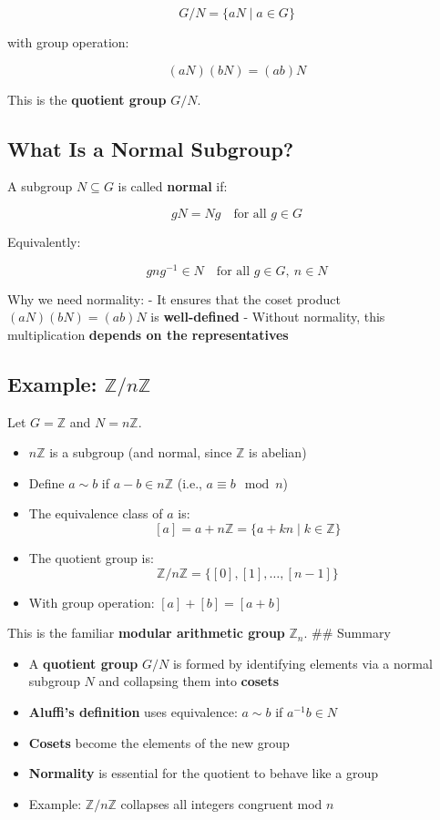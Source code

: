 \documentclass[]{article}
\providecommand{\tightlist}{%
  \setlength{\itemsep}{0pt}\setlength{\parskip}{0pt}}
\begin{document}
\[
G / N = \{ aN \mid a \in G \}
\]

with group operation:

\[
(aN)(bN) = (ab)N
\]

This is the \textbf{quotient group} \(G/N\).

\subsection{ What Is a Normal
Subgroup?}\label{what-is-a-normal-subgroup}

A subgroup \(N \subseteq G\) is called \textbf{normal} if:

\[
gN = Ng \quad \text{for all } g \in G
\]

Equivalently:

\[
gng^{-1} \in N \quad \text{for all } g \in G,\ n \in N
\]

Why we need normality: - It ensures that the coset product
\((aN)(bN) = (ab)N\) is \textbf{well-defined} - Without normality, this
multiplication \textbf{depends on the representatives}

\subsection{\texorpdfstring{Example:
\(\mathbb{Z} / n\mathbb{Z}\)}{Example: \textbackslash mathbb\{Z\} / n\textbackslash mathbb\{Z\}}}\label{example-mathbbz-nmathbbz}

Let \(G = \mathbb{Z}\) and \(N = n\mathbb{Z}\).

\begin{itemize}
\tightlist
\item
  \(n\mathbb{Z}\) is a subgroup (and normal, since \(\mathbb{Z}\) is
  abelian)
\item
  Define \(a \sim b\) if \(a - b \in n\mathbb{Z}\) (i.e.,
  \(a \equiv b \mod n\))
\item
  The equivalence class of \(a\) is: \[
  [a] = a + n\mathbb{Z} = \{ a + kn \mid k \in \mathbb{Z} \}
  \]
\item
  The quotient group is: \[
  \mathbb{Z} / n\mathbb{Z} = \{ [0], [1], \dots, [n - 1] \}
  \]
\item
  With group operation: \([a] + [b] = [a + b]\)
\end{itemize}

This is the familiar \textbf{modular arithmetic group} \(\mathbb{Z}_n\).
\#\# Summary

\begin{itemize}
\tightlist
\item
  A \textbf{quotient group} \(G/N\) is formed by identifying elements
  via a normal subgroup \(N\) and collapsing them into \textbf{cosets}
\item
  \textbf{Aluffi's definition} uses equivalence: \(a \sim b\) if
  \(a^{-1}b \in N\)
\item
  \textbf{Cosets} become the elements of the new group
\item
  \textbf{Normality} is essential for the quotient to behave like a
  group
\item
  Example: \(\mathbb{Z}/n\mathbb{Z}\) collapses all integers congruent
  mod \(n\)
\end{itemize}
\end{document}
